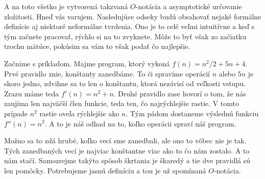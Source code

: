 A na toto všetko je vytvorená takzvaná $O$-notácia a asymptotické určovanie zložitosti.
Hneď vás varujem. Nasledujúce odseky budú obsahovať nejaké formálne definície aj niektoré neformálne
tvrdenia. Ono je to celé veľmi intuitívne a keď s tým začnete pracovať, rýchlo si na to zvyknete.
Môže to byť však zo začiatku trochu mätúce, pokúsim sa vám to však podať čo najlepšie.

Začnime s príkladom. Majme program, ktorý vykoná $f(n) = n^2/2 + 5n + 4$. Prvé pravidlo znie,
konštanty zanedbáme. To či spravíme operácií $n$ alebo $5n$ je skoro jedno, zdvihne sa to len o
konštantu, ktorá nezávisí od veľkosti vstupu. Zrazu máme teda $f'(n) = n^2 + n$. Druhé pravidlo zase
hovorí o tom, že nás zaujíma len najväčší člen funkcie, teda ten, čo najrýchlejšie rastie. V tomto
prípade $n^2$ rastie oveľa rýchlejšie ako $n$. Tým pádom dostaneme výslednú funkciu $f''(n) = n^2$.
A to je náš odhad na to, koľko operácii spraví náš program.

Možno sa to zdá hrubé, koľko vecí sme zanedbali, ale ono to vôbec nie je tak. Tých zanedbaných vecí
je najviac konštantne viac ako to čo nám zostalo. A to nám stačí. Samozrejme takýto spôsob škrtania
je škaredý a tie dve pravidlá sú len pomôcky. Potrebujeme jasnú definíciu a tou je už spomínaná
$O$-notácia.


